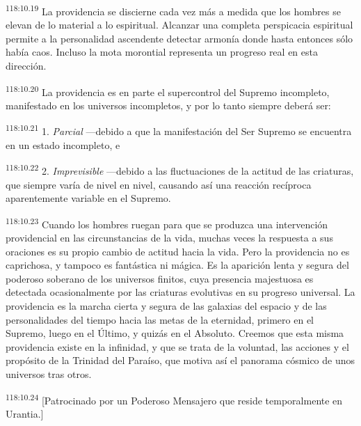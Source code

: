 \par
\textsuperscript{118:10.19} La providencia se discierne cada vez más a medida que los hombres se elevan de lo material a lo espiritual. Alcanzar una completa perspicacia espiritual permite a la personalidad ascendente detectar armonía donde hasta entonces sólo había caos. Incluso la mota morontial representa un progreso real en esta dirección.

\par
\textsuperscript{118:10.20} La providencia es en parte el supercontrol del Supremo incompleto, manifestado en los universos incompletos, y por lo tanto siempre deberá ser:

\par
\textsuperscript{118:10.21} 1. \textit{Parcial} ---debido a que la manifestación del Ser Supremo se encuentra en un estado incompleto, e

\par
\textsuperscript{118:10.22} 2. \textit{Imprevisible} ---debido a las fluctuaciones de la actitud de las criaturas, que siempre varía de nivel en nivel, causando así una reacción recíproca aparentemente variable en el Supremo.

\par
\textsuperscript{118:10.23} Cuando los hombres ruegan para que se produzca una intervención providencial en las circunstancias de la vida, muchas veces la respuesta a sus oraciones es su propio cambio de actitud hacia la vida. Pero la providencia no es caprichosa, y tampoco es fantástica ni mágica. Es la aparición lenta y segura del poderoso soberano de los universos finitos, cuya presencia majestuosa es detectada ocasionalmente por las criaturas evolutivas en su progreso universal. La providencia es la marcha cierta y segura de las galaxias del espacio y de las personalidades del tiempo hacia las metas de la eternidad, primero en el Supremo, luego en el Último, y quizás en el Absoluto. Creemos que esta misma providencia existe en la infinidad, y que se trata de la voluntad, las acciones y el propósito de la Trinidad del Paraíso, que motiva así el panorama cósmico de unos universos tras otros.

\par
\textsuperscript{118:10.24} [Patrocinado por un Poderoso Mensajero que reside temporalmente en Urantia.]